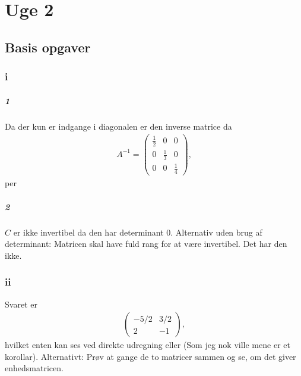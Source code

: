 
\chapter{Uge 2}

	\section{Basis opgaver}

		\subsection{i}

			\paragraph{1} Da der kun er indgange i diagonalen er den inverse matrice da
				\begin{align*}
					A^{-1}=\left(\begin{array}{lll}{\frac{1}{2}} & {0} & {0} \\ {0} & {\frac{1}{3}} & {0} \\ {0} & {0} & {\frac{1}{4}}\end{array}\right),
				\end{align*} 
			per \cite[Sætning 2.4.12]{hesselholt2017}

			\paragraph{2} $C$ er ikke invertibel da den har determinant $0$. Alternativ uden brug af determinant: Matricen skal have fuld rang for at være invertibel. Det har den ikke.

		\subsection{ii}

			Svaret er 
				\begin{align*}
					\left(\begin{array}{cc}{-5 / 2} & {3 / 2} \\ {2} & {-1}\end{array}\right),
				\end{align*} 
			hvilket enten kan ses ved direkte udregning eller \cite[Eksempel 3.4.3]{hesselholt2017} (Som jeg nok ville mene er et korollar). Alternativt: Prøv at gange de to matricer sammen og se, om det giver enhedsmatricen.

